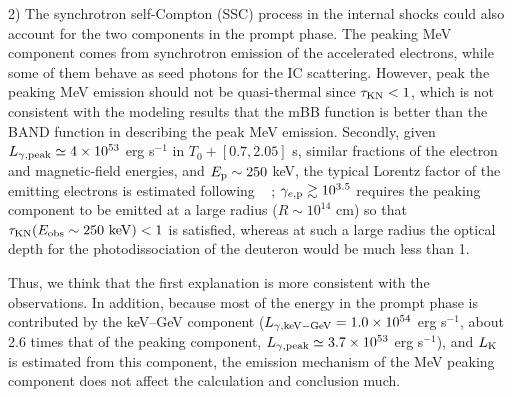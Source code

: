 \documentclass[prd,twocolumn,amsmath,amssymb,aps,linenumbers]{revtex4-2} %
\providecommand{\DIFaddtex}[1]{{\protect\color{blue} \sf #1}} %
\providecommand{\DIFdeltex}[1]{{\protect\color{red} \scriptsize #1}} %
\providecommand{\DIFaddbegin}{} %
\providecommand{\DIFaddend}{} %
\providecommand{\DIFdelbegin}{} %
\providecommand{\DIFdelend}{} %
\providecommand{\DIFadd}[1]{\texorpdfstring{\DIFaddtex{#1}}{#1}} %
\providecommand{\DIFdel}[1]{\texorpdfstring{\DIFdeltex{#1}}{}} %
\newcommand{\DIFscaledelfig}{0.5}
\newlength{\DIFdelgraphicswidth} %
\newlength{\DIFdelgraphicsheight} %
\newcommand{\DIFaddincludegraphics}[2][]{{\color{blue}\fbox{\DIFOincludegraphics[#1]{#2}}}} %
\newcommand{\DIFdelincludegraphics}[2][]{%
\sbox{\DIFdelgraphicsbox}{\DIFOincludegraphics[#1]{#2}}%
\settoboxwidth{\DIFdelgraphicswidth}{\DIFdelgraphicsbox} %
\settoboxtotalheight{\DIFdelgraphicsheight}{\DIFdelgraphicsbox} %
\scalebox{\DIFscaledelfig}{%
\parbox[b]{\DIFdelgraphicswidth}{\usebox{\DIFdelgraphicsbox}\\[-\baselineskip] \rule{\DIFdelgraphicswidth}{0em}}\llap{\resizebox{\DIFdelgraphicswidth}{\DIFdelgraphicsheight}{%
\setlength{\unitlength}{\DIFdelgraphicswidth}%
\begin{picture}(1,1)%
\thicklines\linethickness{2pt} %
{\color[rgb]{1,0,0}\put(0,0){\framebox(1,1){}}}%
{\color[rgb]{1,0,0}\put(0,0){\line( 1,1){1}}}%
{\color[rgb]{1,0,0}\put(0,1){\line(1,-1){1}}}%
\end{picture}%
}\hspace*{3pt}}} %
} %
\DeclareRobustCommand{\DIFaddbegin}{\DIFOaddbegin \let\includegraphics\DIFaddincludegraphics} %
\DeclareRobustCommand{\DIFaddend}{\DIFOaddend \let\includegraphics\DIFOincludegraphics} %
\DeclareRobustCommand{\DIFdelbegin}{\DIFOdelbegin \let\includegraphics\DIFdelincludegraphics} %
\DeclareRobustCommand{\DIFdelend}{\DIFOaddend \let\includegraphics\DIFOincludegraphics} %
\begin{document}
2) The synchrotron self-Compton (SSC) process in the internal shocks could also account for the two components in the prompt phase. The peaking MeV component comes from synchrotron emission of the accelerated electrons, while some of them behave as seed photons for the IC scattering. However, \DIFdelbegin \DIFdel{peak }\DIFdelend \DIFaddbegin \DIFadd{the peaking }\DIFaddend MeV emission should not be quasi-thermal since $\tau_{\rm KN}<1$, which is not consistent with the modeling results that the mBB function is better than the BAND function in describing \DIFaddbegin \DIFadd{the }\DIFaddend peak MeV emission. \DIFaddbegin \DIFadd{Secondly, given $L_{\gamma,\rm peak}\simeq4\times10^{53}$ erg s$^{-1}$ in $T_0+[0.7, 2.05]$ s, similar fractions of the electron and magnetic-field energies, and $E_{\rm p}\sim250$ keV, the typical Lorentz factor of the emitting electrons is estimated following \mbox{%
\cite{2011ApJ...726...90Z}}\hskip0pt%
; $\gamma_{e,\rm p}\gtrsim10^{3.5}$ requires the peaking component to be emitted at a large radius ($R\sim10^{14}$ cm) so that $\tau_{\rm KN}(E_{\rm obs}\sim250~{\rm keV})<1$ is satisfied, whereas at such a large radius the optical depth for the photodissociation of the deuteron would be much less than 1.
}\DIFaddend 

Thus, we think that the first explanation is more consistent with the observations. \DIFaddbegin \DIFadd{In addition, because most of the energy in the prompt phase is contributed by the keV--GeV component ($L_{\gamma,\rm keV-GeV}=1.0\times10^{54}$ erg s$^{-1}$, about 2.6 times that of the peaking component, $L_{\gamma,\rm peak}\simeq3.7\times10^{53}$ erg s$^{-1}$), and $L_{\rm K}$ is estimated from this component, the emission mechanism of the MeV peaking component does not affect the calculation and conclusion much.
}\DIFaddend 
\end{document}
